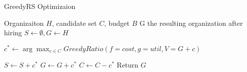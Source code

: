 
\begin{algorithm}
	\caption{ GreedyRS Optimizaion }
	\label{alg:greed-RS}
	\begin{algorithmic}[1]
		\renewcommand{\algorithmicrequire}{\textbf{Input:}}
		\renewcommand{\algorithmicensure}{\textbf{Output:}}
		\Require Organizaiton $ H $, candidate set $ C $, budget $ B $
		\Ensure G the resulting organization after hiring
		\State $S \leftarrow \emptyset, G \leftarrow H$
		
			\State $c^* \leftarrow \arg \max_{c \in C} GreedyRatio(f=cost,g=util,V=G+c)$
			
				\State $S \leftarrow S + c^* $
				\State $G \leftarrow G + c^* $
			\EndIf
			\State $C \leftarrow C - c^*$
		\EndWhile
		\State Return $G$
	\end{algorithmic}
\end{algorithm}